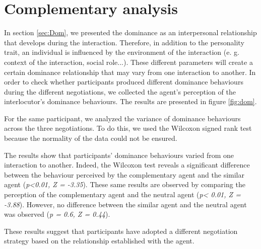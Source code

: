 \documentclass[10pt, a4paper, twocolumn]{article} %
\begin{document}
	\section{Complementary analysis}
	In section \ref{sec:Dom}, we presented the dominance as an interpersonal relationship that develops during the interaction. 
	Therefore, in addition to the personality trait, an individual is influenced by the environment of the interaction (e. g. context of the interaction, social role...). These different parameters will create a certain dominance relationship that may vary from one interaction to another.  
	In order to check whether participants produced different dominance behaviours during the different negotiations, we collected the agent's perception of the interlocutor's dominance behaviours.  The results are presented in figure \ref{fig:dom}.
	
	For the same participant, we analyzed the variance of dominance behaviours across the three negotiations. To do this, we used the Wilcoxon signed rank test because the normality of the data could not be ensured. 
	
	The results show that participants' dominance behaviours varied from one interaction to another. Indeed, the Wilcoxon test reveals a significant difference between the behaviour perceived by the complementary agent and the similar agent (\emph{p<0.01, Z = -3.35}). These same results are observed by comparing the perception of the complementary agent and the neutral agent (\emph{p< 0.01, Z = -3.88}).
	However, no difference between the similar agent and the neutral agent was observed (\emph{p = 0.6, Z = 0.44}). 
	
	These results suggest that participants have adopted a different negotiation strategy based on the relationship established with the agent.
%		
%		
%		
\end{document}
